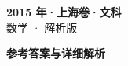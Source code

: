 \documentclass[zihao=-4, a4paper]{ctexart}
\begin{document}
\begin{center}
  {\Large\bfseries 2015 年·上海卷·文科}\\[4pt]
  {\large 数学 · 解析版}
\end{center}
\medskip
{}

\clearpage
{}
\begin{center}{\Large\bfseries 参考答案与详细解析}\end{center}
\medskip

\end{document}
